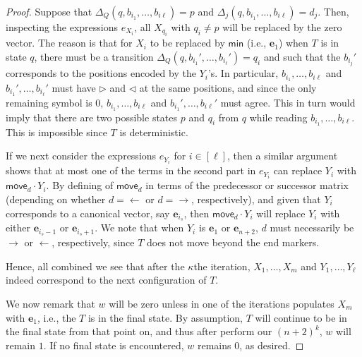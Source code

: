 \begin{proof}
Suppose that
$\Delta_Q(q,b_{i_1},\ldots,b_{i\ell})=p$ and
$\Delta_j(q,b_{i_1},\ldots,b_{i\ell})=d_j$. Then, inspecting the expressions $e_{X_i}$, all $X_{q_i}$ with $q_i\neq p$ will be replaced by the zero vector. The reason is that for $X_i$ to be replaced by $\mathsf{min}$ (i.e., $\mathbf{e}_1$) when $T$ is in state $q$,
there must be a transition $\Delta_Q(q,b_{i_1}',\ldots,b_{i_\ell}')=q_i$
and such that the $b_{i_j}'$ corresponds to the positions encoded by
the $Y_i$'s. In particular, $b_{i_1},\ldots,b_{i\ell}$ and 
$b_{i_1}',\ldots,b_{i_\ell}'$ must have $\rhd$ and $\lhd$ at the same positions, and since the only remaining symbol is $0$, $b_{i_1},\ldots,b_{i\ell}$ and $b_{i_1}',\ldots,b_{i\ell}'$ must agree.
This in turn would imply that there are two possible states $p$ and $q_i$ from $q$ while reading $b_{i_1},\ldots,b_{i\ell}$. This is impossible since $T$ is deterministic.

If we next consider the expressions $e_{Y_i}$ for $i\in[\ell]$, then a similar argument shows that at most one of the terms in the second part in $e_{Y_i}$ can replace $Y_i$ with $\mathsf{move}_d\cdot Y_i$. By defining of $\mathsf{move}_d$ in terms of the predecessor or successor matrix (depending on whether $d=\gets$ or $d=\to$, respectively), and given that $Y_i$ corresponds to a canonical vector, say $\mathbf{e}_{i_s}$, then $\mathsf{move}_d\cdot Y_i$ will replace $Y_i$
with either $\mathbf{e}_{i_s-1}$ or  $\mathbf{e}_{i_s+1}$. We note that when $Y_i$ is $\mathbf{e}_1$ or $\mathbf{e}_{n+2}$, $d$ must necessarily be $\to$ or $\gets$, respectively, since $T$ does not move beyond the end markers. 

Hence, all combined we see that after the $\kappa$the iteration, $X_1,\ldots,X_m$ and $Y_1,\ldots,Y_\ell$ indeed correspond to the next configuration of $T$.

We now remark that $w$ will be zero unless in one of the iterations populates $X_m$ with $\mathbf{e}_{1}$, i.e., the $T$ is in the final state. By assumption, $T$ will continue to be in the final state from that point on, and thus after perform our $(n+2)^k$, $w$ will remain $1$. If no final state is encountered, $w$ remains $0$, as desired.
\end{proof}
